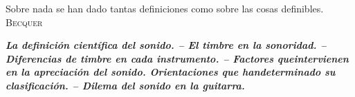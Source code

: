 \documentclass[
11pt, %
a4paper, %
oneside, %
headinclude,footinclude, %
BCOR5mm, %
]{scrartcl}
\begin{document}



\par{Sobre nada se han dado tantas definiciones como sobre las cosas definibles.} \newline
 \textsc{Becquer}
\newline
\par \textbf{\textit{La definición científica del sonido. -- El timbre en la sonoridad. -- Diferencias de timbre en cada instrumento. -- Factores queintervienen en la apreciación del sonido. Orientaciones que handeterminado su clasificación. -- Dilema del sonido en la guitarra.}}
\newline
\end{document}

